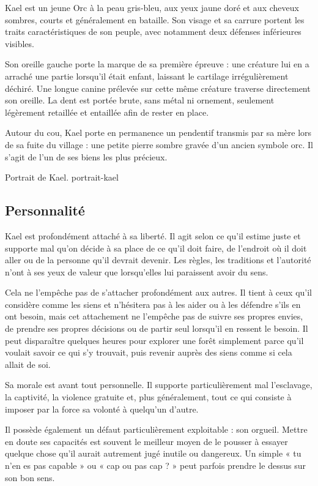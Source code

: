 Kael est un jeune Orc à la peau gris-bleu, aux yeux jaune doré et aux cheveux
sombres, courts et généralement en bataille. Son visage et sa carrure portent
les traits caractéristiques de son peuple, avec notamment deux défenses
inférieures visibles.

Son oreille gauche porte la marque de sa première épreuve : une créature lui en
a arraché une partie lorsqu'il était enfant, laissant le cartilage
irrégulièrement déchiré. Une longue canine prélevée sur cette même créature
traverse directement son oreille. La dent est portée brute, sans métal ni
ornement, seulement légèrement retaillée et entaillée afin de rester en place.

Autour du cou, Kael porte en permanence un pendentif transmis par sa mère lors
de sa fuite du village : une petite pierre sombre gravée d'un ancien symbole
orc. Il s'agit de l'un de ses biens les plus précieux.

  {Portrait de Kael.}
  {portrait-kael}

\subsection*{Personnalité}

Kael est profondément attaché à sa liberté. Il agit selon ce qu'il estime
juste et supporte mal qu'on décide à sa place de ce qu'il doit faire, de
l'endroit où il doit aller ou de la personne qu'il devrait devenir. Les règles,
les traditions et l'autorité n'ont à ses yeux de valeur que lorsqu'elles lui
paraissent avoir du sens.

Cela ne l'empêche pas de s'attacher profondément aux autres. Il tient à ceux
qu'il considère comme les siens et n'hésitera pas à les aider ou à les défendre
s'ils en ont besoin, mais cet attachement ne l'empêche pas de suivre ses propres
envies, de prendre ses propres décisions ou de partir seul lorsqu'il en ressent
le besoin. Il peut disparaître quelques heures pour explorer une forêt simplement
parce qu'il voulait savoir ce qui s'y trouvait, puis revenir auprès des siens
comme si cela allait de soi.

Sa morale est avant tout personnelle. Il supporte particulièrement mal
l'esclavage, la captivité, la violence gratuite et, plus généralement, tout ce
qui consiste à imposer par la force sa volonté à quelqu'un d'autre.

Il possède également un défaut particulièrement exploitable : son orgueil.
Mettre en doute ses capacités est souvent le meilleur moyen de le pousser à
essayer quelque chose qu'il aurait autrement jugé inutile ou dangereux. Un
simple « tu n'en es pas capable » ou « cap ou pas cap ? » peut parfois prendre
le dessus sur son bon sens.

